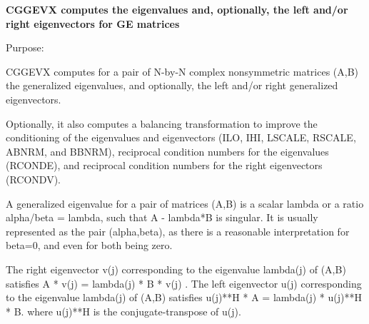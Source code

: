 {\bfseries  C\+G\+G\+E\+V\+X computes the eigenvalues and, optionally, the left and/or right eigenvectors for G\+E matrices} 

 \begin{DoxyParagraph}{Purpose\+: }
\begin{DoxyVerb} CGGEVX computes for a pair of N-by-N complex nonsymmetric matrices
 (A,B) the generalized eigenvalues, and optionally, the left and/or
 right generalized eigenvectors.

 Optionally, it also computes a balancing transformation to improve
 the conditioning of the eigenvalues and eigenvectors (ILO, IHI,
 LSCALE, RSCALE, ABNRM, and BBNRM), reciprocal condition numbers for
 the eigenvalues (RCONDE), and reciprocal condition numbers for the
 right eigenvectors (RCONDV).

 A generalized eigenvalue for a pair of matrices (A,B) is a scalar
 lambda or a ratio alpha/beta = lambda, such that A - lambda*B is
 singular. It is usually represented as the pair (alpha,beta), as
 there is a reasonable interpretation for beta=0, and even for both
 being zero.

 The right eigenvector v(j) corresponding to the eigenvalue lambda(j)
 of (A,B) satisfies
                  A * v(j) = lambda(j) * B * v(j) .
 The left eigenvector u(j) corresponding to the eigenvalue lambda(j)
 of (A,B) satisfies
                  u(j)**H * A  = lambda(j) * u(j)**H * B.
 where u(j)**H is the conjugate-transpose of u(j).\end{DoxyVerb}
 
\end{DoxyParagraph}

